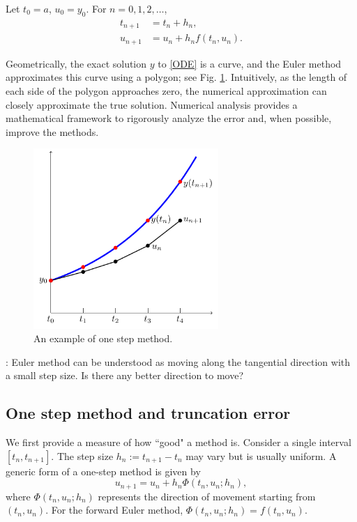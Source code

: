 \documentclass[10pt]{amsart}
\begin{document}
\medskip  
\begin{tcolorbox}[colframe=black!15!white, coltitle=white!5!black, title = \bf Forward/Explicit Euler Method]  
Let $t_0 = a$, $u_0 = y_0$. For $n = 0, 1, 2, \dots$,  
\begin{align*}  
t_{n+1} &= t_n + h_n, \\  
u_{n+1} &= u_n + h_n f(t_n, u_n).  
\end{align*}  
\end{tcolorbox}  

Geometrically, the exact solution $y$ to \eqref{ODE} is a curve, and the Euler method approximates this curve using a polygon; see Fig. \ref{fig:ODEsolver}. Intuitively, as the length of each side of the polygon approaches zero, the numerical approximation can closely approximate the true solution. Numerical analysis provides a mathematical framework to rigorously analyze the error and, when possible, improve the methods.  

\begin{figure}[htbp]
\begin{center}
\includegraphics[width=7cm]{figures/ODEsolver.pdf}
\caption{An example of one step method.}
\label{fig:ODEsolver}
\end{center}
\end{figure}

\medskip
{}: Euler method can be understood as moving along the tangential direction with a small step size. Is there any better direction to move? 
\medskip

\subsection{One step method and truncation error}
We first provide a measure of how ``good" a method is. Consider a single interval $[t_n, t_{n+1}]$. The step size $h_n := t_{n+1} - t_n$ may vary but is usually uniform. A generic form of a one-step method is given by  
\begin{equation}\label{onestep}  
u_{n+1} = u_n + h_n \Phi(t_n, u_n; h_n),  
\end{equation}  
where $\Phi(t_n, u_n; h_n)$ represents the direction of movement starting from $(t_n, u_n)$. For the forward Euler method, $\Phi(t_n, u_n; h_n) = f(t_n, u_n)$.  
\end{document}
